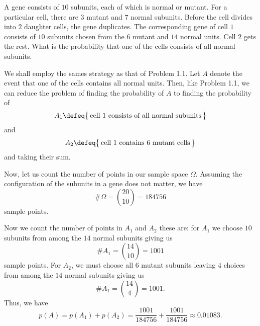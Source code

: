 \begin{problem}
  A gene consists of \(10\) subunits, each of which is normal or
  mutant. For a particular cell, there are \(3\) mutant and \(7\) normal
  subunits. Before the cell divides into \(2\) daughter cells, the gene
  duplicates. The corresponding gene of cell \(1\) consists of \(10\)
  subunits chosen from the \(6\) mutant and \(14\) normal units. Cell \(2\)
  gets the rest. What is the probability that one of the cells consists of
  all normal subunits.
\end{problem}
\begin{solution}
  We shall employ the sames strategy as that of Problem 1.1. Let \(A\)
  denote the event that one of the cells contains all normal units. Then,
  like Problem 1.1, we can reduce the problem of finding the probability of
  \(A\) to finding the probability of
  \[
    A_1\defeq\bigl\{\,\text{cell \(1\) consists of all normal subunits}\,\bigr\}
  \]
  and
  \[
    A_2\defeq\bigl\{\,\text{cell \(1\) contains \(6\) mutant cells}\,\bigr\}
  \]
  and taking their sum.

  Now, let us count the number of points in our sample space
  \(\Omega\). Assuming the configuration of the subunits in a gene does not
  matter, we have
  \begin{equation}
    \label{eq:1-4}
      \#\Omega=\binom{20}{10}=184756
  \end{equation}
  sample points.

  Now we count the number of points in \(A_1\) and \(A_2\) these are: for
  \(A_1\) we choose \(10\) subunits from among the \(14\) normal subunits
  giving us
  \begin{equation}
    \label{eq:1-5}
    \#A_1=\binom{14}{10}=1001
  \end{equation}
  sample points. For \(A_2\), we must choose all \(6\) mutant subunits
  leaving \(4\) choices from among the \(14\) normal subunits giving us
  \begin{equation}
    \label{eq:1-6}
    \#A_1=\binom{14}{4}=1001.
  \end{equation}
  Thus, we have
  \[
    p(A)=%
    p(A_1)+p(A_2)=%
    \frac{1001}{184756}+\frac{1001}{184756}\approx%
    0.01083.
  \]
\end{solution}
\newpage

